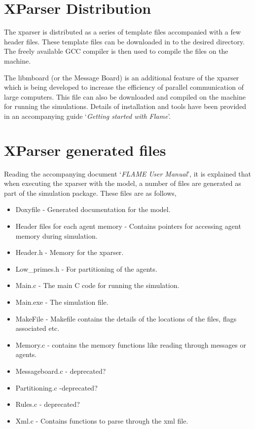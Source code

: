 
\section{XParser Distribution}
The xparser is distributed as a series of template files accompanied with a few header files.
These template files can be downloaded in to the desired directory. The freely available GCC
compiler is then used to compile the files on the machine.

The libmboard (or the Message Board) is an additional feature of the
xparser which is being developed to increase the efficiency of
parallel communication of large computers. This file can also be
downloaded and compiled on the machine for running the simulations.
Details of installation and tools have been provided in an
accompanying guide `\emph{Getting started with Flame}'.

\section{XParser generated files}
Reading the accompanying document `\emph{FLAME User Manual}', it is explained that
when executing the xparser with the model, a number of files are generated as part
of the simulation package. These files are as follows,

\begin{itemize}
\item Doxyfile - Generated documentation for the model.
\item Header files for each agent memory - Contains pointers for accessing agent memory during simulation.
\item Header.h  - Memory for the xparser.
\item Low\_primes.h - For partitioning of the agents.
\item Main.c - The main C code for running the simulation.
\item Main.exe - The simulation file.
\item MakeFile - Makefile contains the details of the locations of the files, flags associated etc.
\item Memory.c - contains the memory functions like reading through messages or agents.
\item Messageboard.c - deprecated?
\item Partitioning.c -deprecated?
\item Rules.c - deprecated?
\item Xml.c - Contains functions to parse through the xml file.
\end{itemize}




